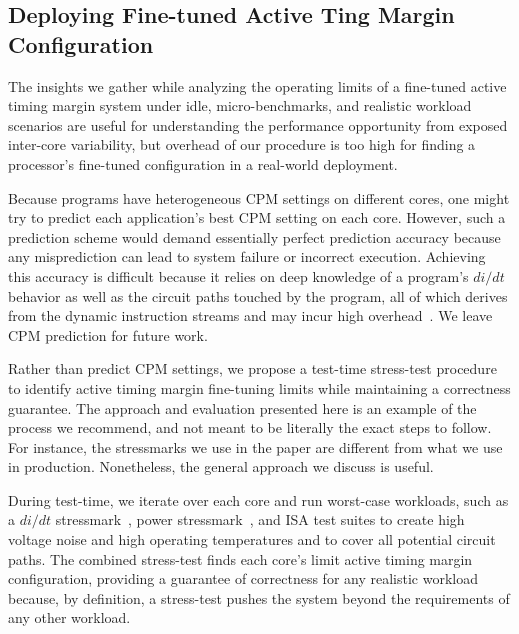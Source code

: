 \subsection{Deploying Fine-tuned Active Ting Margin Configuration}
\label{sec:process:schedule:deploy}

The insights we gather while analyzing the operating limits of a fine-tuned active timing margin system under idle, micro-benchmarks, and realistic workload scenarios are useful for understanding the performance opportunity from exposed inter-core variability, but overhead of our procedure is too high for finding a processor's fine-tuned configuration in a real-world deployment.

Because programs have heterogeneous CPM settings on different cores, one might try to predict each application's best CPM setting on each core. However, such a prediction scheme would demand essentially perfect prediction accuracy because any misprediction can lead to system failure or incorrect execution. Achieving this accuracy is difficult because it relies on deep knowledge of a program's $di/dt$ behavior as well as the circuit paths touched by the program, all of which derives from the dynamic instruction streams and may incur high overhead~\cite{reddi2009voltage}. We leave CPM prediction for future work.

Rather than predict CPM settings, we propose a test-time stress-test procedure to identify active timing margin fine-tuning limits while maintaining a correctness guarantee. The approach and evaluation presented here is an example of the process we recommend, and not meant to be literally the exact steps to follow. For instance, the stressmarks we use in the paper are different from what we use in production. Nonetheless, the general approach we discuss is useful.

During test-time, we iterate over each core and run worst-case workloads, such as a $di/dt$ stressmark~\cite{kim2012audit,bertran2014voltage}, power stressmark~\cite{bertran2012systematic}, and ISA test suites to create high voltage noise and high operating temperatures and to cover all potential circuit paths. The combined stress-test finds each core's limit active timing margin configuration, providing a guarantee of correctness for any realistic workload because, by definition, a stress-test pushes the system beyond the requirements of any other workload.

